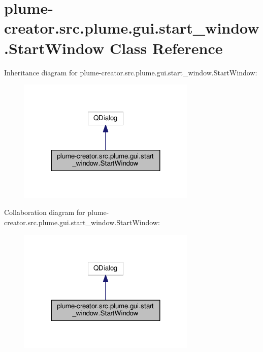 \hypertarget{classplume-creator_1_1src_1_1plume_1_1gui_1_1start__window_1_1_start_window}{}\section{plume-\/creator.src.\+plume.\+gui.\+start\+\_\+window.\+Start\+Window Class Reference}
\label{classplume-creator_1_1src_1_1plume_1_1gui_1_1start__window_1_1_start_window}


Inheritance diagram for plume-\/creator.src.\+plume.\+gui.\+start\+\_\+window.\+Start\+Window\+:\nopagebreak
\begin{figure}[H]
\begin{center}
\leavevmode
\includegraphics[width=240pt]{classplume-creator_1_1src_1_1plume_1_1gui_1_1start__window_1_1_start_window__inherit__graph}
\end{center}
\end{figure}


Collaboration diagram for plume-\/creator.src.\+plume.\+gui.\+start\+\_\+window.\+Start\+Window\+:\nopagebreak
\begin{figure}[H]
\begin{center}
\leavevmode
\includegraphics[width=240pt]{classplume-creator_1_1src_1_1plume_1_1gui_1_1start__window_1_1_start_window__coll__graph}
\end{center}
\end{figure}
